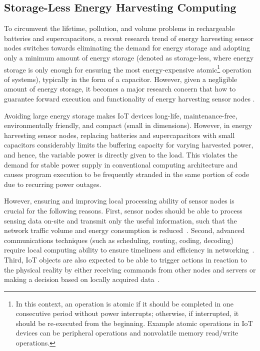 \subsection{Storage-Less Energy Harvesting Computing}


To circumvent the lifetime, pollution, and volume problems in rechargeable batteries and supercapacitors, a recent research trend of energy harvesting sensor nodes switches towards eliminating the demand for energy storage and adopting only a minimum amount of energy storage (denoted as storage-less, where energy storage is only enough for ensuring the most energy-expensive atomic\footnote{In this context, an operation is atomic if it should be completed in one consecutive period without power interrupts; otherwise, if interrupted, it should be re-executed from the beginning. Example atomic operations in IoT devices can be peripheral operations and nonvolatile memory read/write operations.} operation of systems), typically in the form of a capacitor. However, given a negligible amount of energy storage, it becomes a major research concern that how to guarantee forward execution and functionality of energy harvesting sensor nodes .

Avoiding large energy storage makes IoT devices long-life, maintenance-free, environmentally friendly, and compact (small in dimensions). However, in energy harvesting sensor nodes, replacing batteries and supercapacitors with small capacitors considerably limits the buffering capacity for varying harvested power, and hence, the variable power is directly given to the load. This violates the demand for stable power supply in conventional computing architecture and causes program execution to be frequently stranded in the same portion of code due to recurring power outages. 


However, ensuring and improving local processing ability of sensor nodes is crucial for the following reasons. First, sensor nodes should be able to process sensing data on-site and transmit only the useful information, such that the network traffic volume and energy consumption is reduced~\cite{shi2016edge}. Second, advanced communications techniques (such as scheduling, routing, coding, decoding) require local computing ability to ensure timeliness and efficiency in networking~\cite{akyildiz2002wireless}. Third, IoT objects are also expected to be able to trigger actions in reaction to the physical reality by either receiving commands from other nodes and servers or making a decision based on locally acquired data~\cite{miorandi2012internet}. 

